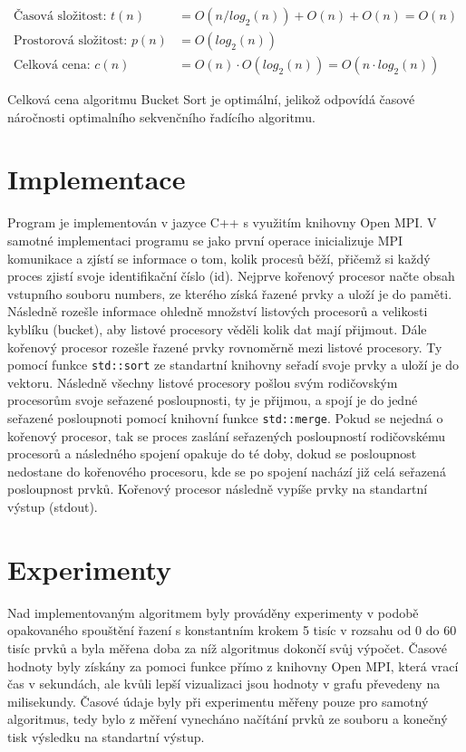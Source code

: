 \documentclass[12pt, a4paper]{article}
\begin{document}
\begin{equation}
\begin{split}
\text{Časová složitost: }t(n) &= O(n/log_{2}(n)) + O(n) + O(n) = O(n)\\
\text{Prostorová složitost: }p(n) &= O(log_{2}(n))\\
\text{Celková cena: }c(n) &= O(n) \cdot O(log_{2}(n)) = O(n\cdot log_{2}(n))
\end{split}
\end{equation}

Celková cena algoritmu Bucket Sort je optimální, jelikož odpovídá časové náročnosti optimalního sekvenčního řadícího algoritmu.

\section{Implementace}
Program je implementován v jazyce C++ s využitím knihovny Open MPI. V samotné implementaci programu se jako první operace inicializuje MPI komunikace a zjístí se informace o tom, kolik procesů běží, přičemž si každý proces zjistí svoje identifikační číslo (id). Nejprve kořenový procesor načte obsah vstupního souboru numbers, ze kterého získá řazené prvky a uloží je do paměti. Následně rozešle informace ohledně množství listových procesorů a velikosti kyblíku (bucket), aby listové procesory věděli kolik dat mají přijmout. Dále kořenový procesor rozešle řazené prvky rovnoměrně mezi listové procesory. Ty pomocí funkce \texttt{std::sort} ze standartní knihovny seřadí svoje prvky a uloží je do vektoru. Následně všechny listové procesory pošlou svým rodičovským procesorům svoje seřazené posloupnosti, ty je přijmou, a spojí je do jedné seřazené posloupnoti pomocí knihovní funkce \texttt{std::merge}. Pokud se nejedná o kořenový procesor, tak se proces zaslání seřazených posloupností rodičovskému procesorů a následného spojení opakuje do té doby, dokud se posloupnost nedostane do kořenového procesoru, kde se po spojení nachází již celá seřazená posloupnost prvků. Kořenový procesor následně vypíše prvky na standartní výstup (stdout).

\section{Experimenty}
Nad implementovaným algoritmem byly prováděny experimenty v podobě opakovaného spouštění řazení s konstantním krokem 5 tisíc v rozsahu od 0 do 60 tisíc prvků a byla měřena doba za níž algoritmus dokončí svůj výpočet. Časové hodnoty byly získány za pomoci funkce přímo z knihovny Open MPI, která vrací čas v sekundách, ale kvůli lepší vizualizaci jsou hodnoty v grafu převedeny na milisekundy. Časové údaje byly při experimentu měřeny pouze pro samotný algoritmus, tedy bylo z měření vynecháno načítání prvků ze souboru a konečný tisk výsledku na standartní výstup.
\end{document}
